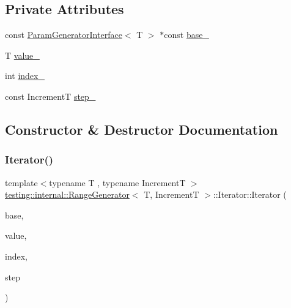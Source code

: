 \subsection*{Private Attributes}
\begin{DoxyCompactItemize}
\item 
const \hyperlink{classtesting_1_1internal_1_1ParamGeneratorInterface}{Param\+Generator\+Interface}$<$ T $>$ $\ast$const \hyperlink{classtesting_1_1internal_1_1RangeGenerator_1_1Iterator_aa6767ad52e3cbd87c457fb5b8b6a21d9}{base\+\_\+}
\item 
T \hyperlink{classtesting_1_1internal_1_1RangeGenerator_1_1Iterator_aab59a7070669d64348494a1fb1795934}{value\+\_\+}
\item 
int \hyperlink{classtesting_1_1internal_1_1RangeGenerator_1_1Iterator_a2e9064f8da43367550e82eea8adabc2c}{index\+\_\+}
\item 
const IncrementT \hyperlink{classtesting_1_1internal_1_1RangeGenerator_1_1Iterator_a18ebb51d061695f102c2ef74cade8618}{step\+\_\+}
\end{DoxyCompactItemize}


\subsection{Constructor \& Destructor Documentation}
\mbox{\label{classtesting_1_1internal_1_1RangeGenerator_1_1Iterator_a960184d2ea0ff223d9cf4d6ab015baa8}} 
\subsubsection{\texorpdfstring{Iterator()}{Iterator()}\hspace{0.1cm}{\footnotesize\ttfamily [1/2]}}
{\footnotesize\ttfamily template$<$typename T , typename IncrementT $>$ \\
\hyperlink{classtesting_1_1internal_1_1RangeGenerator}{testing\+::internal\+::\+Range\+Generator}$<$ T, IncrementT $>$\+::Iterator\+::\+Iterator (\begin{DoxyParamCaption}\item[{const \hyperlink{classtesting_1_1internal_1_1ParamGeneratorInterface}{Param\+Generator\+Interface}$<$ T $>$ $\ast$}]{base,  }\item[{T}]{value,  }\item[{int}]{index,  }\item[{IncrementT}]{step }\end{DoxyParamCaption})\hspace{0.3cm}{\ttfamily [inline]}}

